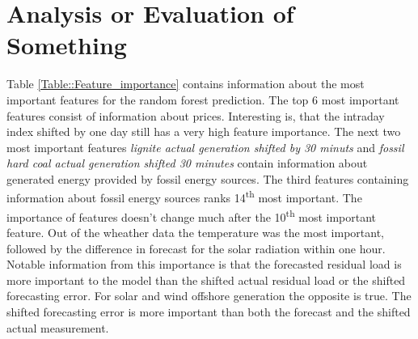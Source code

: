 \documentclass[class=scrbook, crop=false]{standalone}
\begin{document}
\section{Analysis or Evaluation of Something}
\label{Section::Analysis or Evaluation of Something}    

Table \ref{Table::Feature_importance} contains information about the most important features for the random forest prediction.
The top 6 most important features consist of information about prices. Interesting is, that the intraday index shifted by one day still has a very high feature importance.
The next two most important features \textit{lignite actual generation shifted by 30 minuts} and \textit{fossil hard coal actual generation shifted 30 minutes} contain information about generated energy provided by fossil energy sources.
The third features containing information about fossil energy sources ranks 14\textsuperscript{th} most important. 
The importance of features doesn't change much after the  10\textsuperscript{th} most important feature.
Out of the wheather data the temperature was the most important, followed by the difference in forecast for the solar radiation within one hour.
Notable information from this importance is that the forecasted residual load is more important to the model than the shifted actual residual load or the shifted forecasting error.
For solar and wind offshore generation the opposite is true. 
The shifted forecasting error is more important than both the forecast and the shifted actual measurement.
\end{document}
